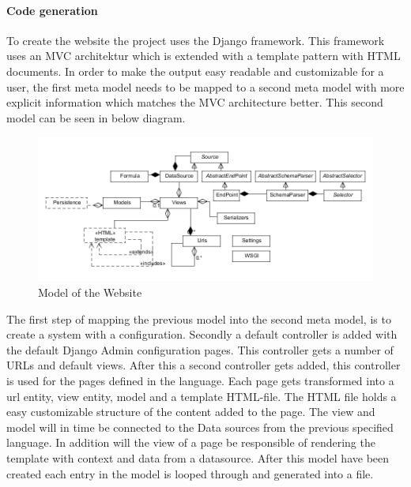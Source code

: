 \paragraph{Code generation}
To create the website the project uses the Django framework. 
This framework uses an MVC architektur which is extended with a template pattern with HTML documents. 
In order to make the output easy readable and customizable for a user, the first meta model needs to be mapped to a second meta model with more explicit information which matches the MVC architecture better.
This second model can be seen in below diagram. 

\begin{figure}
\begin{center}
\includegraphics[width=\linewidth]{images/websitemodel}
\end{center}
\caption{Model of the Website}
\label{fig:websitemodel}
\end{figure}

The first step of mapping the previous model into the second meta model, is to create a system with a configuration. 
Secondly a default controller is added with the default Django Admin configuration pages. 
This controller gets a number of URLs and default views. 
After this a second controller gets added, this controller is used for the pages defined in the language. 
Each page gets transformed into a url entity, view entity, model and a template HTML-file.
The HTML file holds a easy customizable structure of the content added to the page. The view and model will in time be connected to the Data sources from the previous specified language. 
In addition will the view of a page be responsible of rendering the template with context and data from a datasource. 
After this model have been created each entry in the model is looped through and generated into a file.


